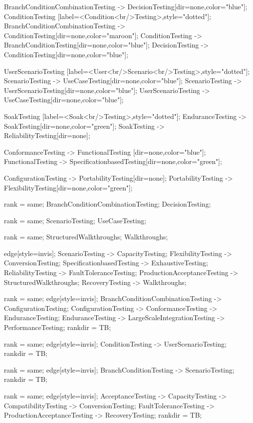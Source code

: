 \documentclass{article}
\begin{document}
{BranchConditionCombinationTesting -> DecisionTesting[dir=none,color="blue"];
ConditionTesting [label=<Condition<br/>Testing>,style="dotted"];
BranchConditionCombinationTesting -> ConditionTesting[dir=none,color="maroon"];
ConditionTesting -> BranchConditionTesting[dir=none,color="blue"];
DecisionTesting -> ConditionTesting[dir=none,color="blue"];

UserScenarioTesting [label=<User<br/>Scenario<br/>Testing>,style="dotted"];
ScenarioTesting -> UseCaseTesting[dir=none,color="blue"];
ScenarioTesting -> UserScenarioTesting[dir=none,color="blue"];
UserScenarioTesting -> UseCaseTesting[dir=none,color="blue"];

SoakTesting [label=<Soak<br/>Testing>,style="dotted"];
EnduranceTesting -> SoakTesting[dir=none,color="green"];
SoakTesting -> ReliabilityTesting[dir=none];

ConformanceTesting -> FunctionalTesting [dir=none,color="blue"];
FunctionalTesting -> SpecificationbasedTesting[dir=none,color="green"];

ConfigurationTesting -> PortabilityTesting[dir=none];
PortabilityTesting -> FlexibilityTesting[dir=none,color="green"];

{
rank = same;
BranchConditionCombinationTesting;
DecisionTesting;
}

{
rank = same;
ScenarioTesting;
UseCaseTesting;
}

{
rank = same;
StructuredWalkthroughs;
Walkthroughs;
}

{
edge[style=invis];
ScenarioTesting -> CapacityTesting;
FlexibilityTesting -> ConversionTesting;
SpecificationbasedTesting -> ExhaustiveTesting;
ReliabilityTesting -> FaultToleranceTesting;
ProductionAcceptanceTesting -> StructuredWalkthroughs;
RecoveryTesting -> Walkthroughs;
}

{
rank = same;
edge[style=invis];
BranchConditionCombinationTesting -> ConfigurationTesting;
ConfigurationTesting -> ConformanceTesting -> EnduranceTesting;
EnduranceTesting -> LargeScaleIntegrationTesting -> PerformanceTesting;
rankdir = TB;
}

{
rank = same;
edge[style=invis];
ConditionTesting -> UserScenarioTesting;
rankdir = TB;
}

{
rank = same;
edge[style=invis];
BranchConditionTesting -> ScenarioTesting;
rankdir = TB;
}

{
rank = same;
edge[style=invis];
AcceptanceTesting -> CapacityTesting -> CompatibilityTesting -> ConversionTesting;
FaultToleranceTesting -> ProductionAcceptanceTesting -> RecoveryTesting;
rankdir = TB;
}

}
\end{document}
